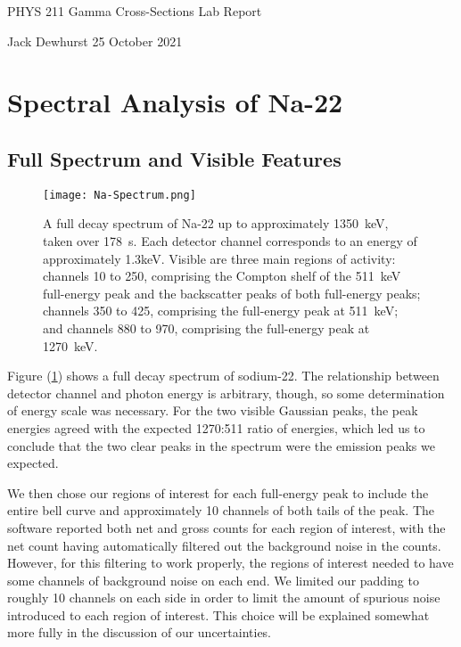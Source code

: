 \documentclass[letter]{article}
\begin{document}

\begin{center}
	{\large PHYS 211 Gamma Cross-Sections Lab Report}
	
	Jack Dewhurst \hspace{1cm}
	25 October 2021
	
	\vspace{5mm}
\end{center}
	


\section{Spectral Analysis of Na-22}

\subsection{Full Spectrum and Visible Features}
\begin{figure}[h] \centering
    \texttt{[image: Na-Spectrum.png]}
    \caption{A full decay spectrum of Na-22 up to approximately \qty{1350}{\kilo\electronvolt}, taken over \qty{178}{\second}. Each detector channel corresponds to an energy of approximately 1.3keV. Visible are three main regions of activity: channels 10 to 250, comprising the Compton shelf of the \qty{511}{\kilo\electronvolt} full-energy peak and the backscatter peaks of both full-energy peaks; channels 350 to 425, comprising the full-energy peak at \qty{511}{\kilo\electronvolt}; and channels 880 to 970, comprising the full-energy peak at \qty{1270}{\kilo\electronvolt}.}
    \label{fig:NaFullSpec}
\end{figure}

Figure (\ref{fig:NaFullSpec}) shows a full decay spectrum of sodium-22. The relationship between detector channel and photon energy is arbitrary, though, so some determination of energy scale was necessary. For the two visible Gaussian peaks, the peak energies agreed with the expected 1270:511 ratio of energies, which led us to conclude that the two clear peaks in the spectrum were the emission peaks we expected.

We then chose our regions of interest for each full-energy peak to include the entire bell curve and approximately 10 channels of both tails of the peak. The software reported both net and gross counts for each region of interest, with the net count having automatically filtered out the background noise in the counts. However, for this filtering to work properly, the regions of interest needed to have some channels of background noise on each end. We limited our padding to roughly 10 channels on each side in order to limit the amount of spurious noise introduced to each region of interest. This choice will be explained somewhat more fully in the discussion of our uncertainties.
\end{document}
